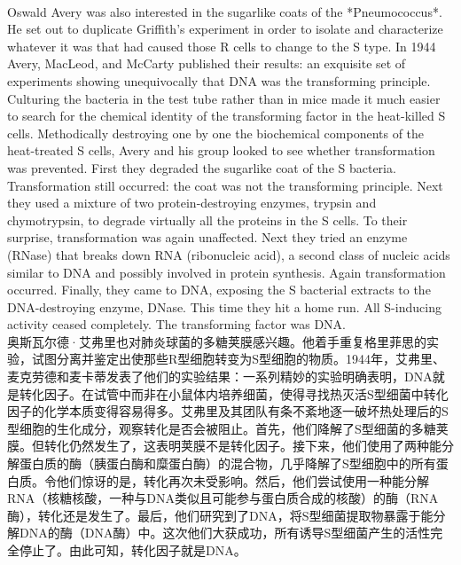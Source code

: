 \documentclass{article}
\begin{document}
\\
Oswald Avery was also interested in the sugarlike coats of the *Pneumococcus*. He set out to duplicate Griffith’s experiment in order to isolate and characterize whatever it was that had caused those R cells to change to the S type. In 1944 Avery, MacLeod, and McCarty published their results: an exquisite set of experiments showing unequivocally that DNA was the transforming principle. Culturing the bacteria in the test tube rather than in mice made it much easier to search for the chemical identity of the transforming factor in the heat-killed S cells. Methodically destroying one by one the biochemical components of the heat-treated S cells, Avery and his group looked to see whether transformation was prevented. First they degraded the sugarlike coat of the S bacteria. Transformation still occurred: the coat was not the transforming principle. Next they used a mixture of two protein-destroying enzymes, trypsin and chymotrypsin, to degrade virtually all the proteins in the S cells. To their surprise, transformation was again unaffected. Next they tried an enzyme (RNase) that breaks down RNA (ribonucleic acid), a second class of nucleic acids similar to DNA and possibly involved in protein synthesis. Again transformation occurred. Finally, they came to DNA, exposing the S bacterial extracts to the DNA-destroying enzyme, DNase. This time they hit a home run. All S-inducing activity ceased completely. The transforming factor was DNA.\\
奥斯瓦尔德·艾弗里也对肺炎球菌的多糖荚膜感兴趣。他着手重复格里菲思的实验，试图分离并鉴定出使那些R型细胞转变为S型细胞的物质。1944年，艾弗里、麦克劳德和麦卡蒂发表了他们的实验结果：一系列精妙的实验明确表明，DNA就是转化因子。在试管中而非在小鼠体内培养细菌，使得寻找热灭活S型细菌中转化因子的化学本质变得容易得多。艾弗里及其团队有条不紊地逐一破坏热处理后的S型细胞的生化成分，观察转化是否会被阻止。首先，他们降解了S型细菌的多糖荚膜。但转化仍然发生了，这表明荚膜不是转化因子。接下来，他们使用了两种能分解蛋白质的酶（胰蛋白酶和糜蛋白酶）的混合物，几乎降解了S型细胞中的所有蛋白质。令他们惊讶的是，转化再次未受影响。然后，他们尝试使用一种能分解RNA（核糖核酸，一种与DNA类似且可能参与蛋白质合成的核酸）的酶（RNA酶），转化还是发生了。最后，他们研究到了DNA，将S型细菌提取物暴露于能分解DNA的酶（DNA酶）中。这次他们大获成功，所有诱导S型细菌产生的活性完全停止了。由此可知，转化因子就是DNA。\\ 
\end{document}
